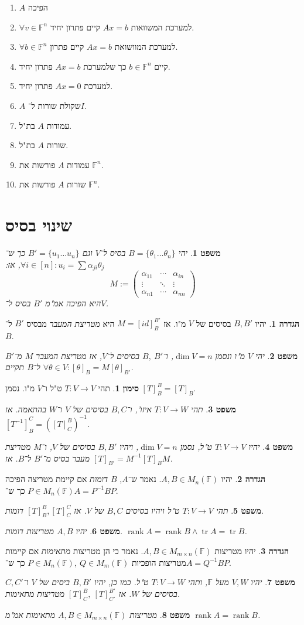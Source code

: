 \documentclass[]{article}
\DeclareMathOperator{\rk}     {rank}
\DeclareMathOperator{\tr}     {tr}
\newcommand\ta    {\theta}
\newcommand\F         {\mathbb{F}}
\newcommand\co        {\colon}
\newcommand\mat[2]    {M_{#1\times#2}}
\newcommand\gmat      {\mat{m}{n}(\F)}
\newcommand\pms[1]    {\begin{pmatrix}
		#1
\end{pmatrix}}
\newcommand\ag        {\alpha}
\newcommand\op    {^{-1}}
\newtheorem{Theorem}{משפט}
\theoremstyle{definition}
\newtheorem{definition}{הגדרה}
\newtheorem{Notion}{סימון}
\newcommand\theo  [1] {\begin{Theorem}#1\end{Theorem}}
\newcommand\defi  [1] {\begin{definition}#1\end{definition}}
\newcommand\noti  [1] {\begin{Notion}#1\end{Notion}}
\begin{document}
\begin{multicols}{2}
{		\begin{enumerate}
			\item $A$ הפיכה
			\item $\forall v \in \F^n$ למערכת המשוואות $Ax = b$ קיים פתרון יחיד. 
			\item $\forall b \in \F^n$ למערכת המוושואת $Ax = b$ קיים פתרון. 
			\item קיים $b \in \F^n$ כך שלמערכת $Ax = b$ פתרון יחיד. 
			\item למערכת $Ax =0$ פתרון יחיד. 
			\item $A$ שקולת שורות ל־$I$. 
			\item עמודות $A$ בת"ל. 
			\item שורות $A$ בת"ל. 
			\item עמודות $A$ פורשות את $\F^n$. 
			\item שורות $A$ פורשות את $\F^n$. 
		\end{enumerate}}
	
		\section{שינוי בסיס}
		\theo{יהי $B = \{\ta_1 \dots \ta_n\}$ בסיס ל־$V$ וגם $B' = \{u_1 \dots u_n\}$ כך ש־$\forall i \in [n] \co u_i = \sum \ag_{ji} \ta_j$, אז: 
			\[ M := \pms{\ag_{11} & \cdots & \ag_{in} \\ \vdots & \ddots & \vdots \\ \ag_{n1} & \cdots & \ag_{nn}} \]
			היא הפיכה אמ"מ $B'$ בסיס ל־$V$. 
		}
		\defi{יהיו $B, B'$ בסיסים של $V$ מ"ו. אז $M = [id]^{B'}_B$ היא \textit{מטריצת המעבר} מבסיס $B'$ ל־$B$. }
		\theo{יהי $V$ מ"ו ונסמן $\dim V = n$, ו־$B, \ B'$ בסיסים ל־$V$, אז מטריצת המעבר $M$ מ־$B'$ ל־$B$ תקיים $\forall \ta \in V \co [\ta]_B = M[\ta]_{B'}$. }
		\noti{תהי $T \co V \to V$ ט"ל ו־$V$ מ"ו. נסמן $[T]_B^B = [T]_B$. }
		\theo{תהי $T \co V \to W$ איזו', ו־$B, C$ בסיסים של $V$ ו־$W$ בהתאמה. אז $[T\op]^{C}_B = ([T]^B_C)\op$. }
		\theo{יהיו $T \co V \to V$ ט"ל, נסמן $\dim V = n$, ויהיו $B, B'$ בסיסים של $V$, ו־$M$ מטריצת מעבר בסיס מ־$B'$ ל־$B$. אז $[T]_{B'} = M\op[T]_BM$. }
		
		\defi{יהיו $A, B \in M_n(\F)$. נאמר ש־$A$, $B$ \textit{דומות} אם קיימת מטריצה הפיכה $P \in M_n(\F)$ כך ש־$A = P\op B P$. }
		\theo{תהי $T \co V \to V$ ט"ל ויהיו בסיסים $B, C$ של $V$. אז $[T]^B_B, [T]^C_C$ דומות. }
		\theo{יהיו $A, B$ מטריצות דומות. $\rk A = \rk B \land \tr A = \tr B$. }
		
		\defi{יהיו מטריצות $A, B \in M_{m \times n}(\F)$. נאמר כי הן מטריצות \textit{מתאימות} אם קיימות מטריצות הופכיות $P \in M_n(\F), \ Q \in M_m(\F)$ כך ש־$A = Q\op BP$. }
		\theo{יהיו $V, W$ מעל $\F$, ותהי $T \co V \to W$ ט"ל. כמו כן, יהיו $B, B'$ ביסים של $V$ ו־$C, C'$ בסיסים של $W$. אז $[T]^B_C, \ [T]^{B'}_{C'}$ מטריצות מתאימות. }
		\theo{מטריצות $A, B \in \gmat$ מתאימות אמ"מ $\rk A = \rk B$. }
		

\end{multicols}
\end{document}
